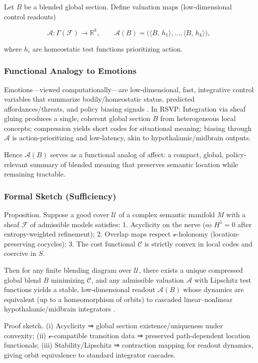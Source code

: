 \documentclass[12pt]{article}
\begin{document}
Let $B$ be a blended global section. Define valuation maps (low-dimensional control readouts)

\[
\mathcal{A}:\Gamma(\mathcal{F}) \to \mathbb{R}^k, \qquad \mathcal{A}(B) = \big( \langle B,\, h_1\rangle,\dots,\langle B,\, h_k\rangle \big),
\]

where $h_i$ are homeostatic test functions prioritizing action.

\subsubsection{Functional Analogy to Emotions}

Emotions—viewed computationally—are low-dimensional, fast, integrative control variables that summarize bodily/homeostatic status, predicted affordances/threats, and policy biasing signals \citep{Pessoa2017}. In RSVP: Integration via sheaf gluing produces a single, coherent global section $B$ from heterogeneous local concepts; compression yields short codes for situational meaning; biasing through $\mathcal{A}$ is action-prioritizing and low-latency, akin to hypothalamic/midbrain outputs.

Hence $\mathcal{A}(B)$ serves as a functional analog of affect: a compact, global, policy-relevant summary of blended meaning that preserves semantic location while remaining tractable.

\subsubsection{Formal Sketch (Sufficiency)}

Proposition. Suppose a good cover $\mathcal{U}$ of a complex semantic manifold $M$ with a sheaf $\mathcal{F}$ of admissible models satisfies: 1. Acyclicity on the nerve (so $H^1=0$ after entropy-weighted refinement); 2. Overlap maps respect $\mathcal{v}$-holonomy (location-preserving cocycles); 3. The cost functional $\mathcal{C}$ is strictly convex in local codes and coercive in $S$.

Then for any finite blending diagram over $\mathcal{U}$, there exists a unique compressed global blend $B$ minimizing $\mathcal{C}$, and any admissible valuation $\mathcal{A}$ with Lipschitz test functions yields a stable, low-dimensional readout $\mathcal{A}(B)$ whose dynamics are equivalent (up to a homeomorphism of orbits) to cascaded linear–nonlinear hypothalamic/midbrain integrators \citep{Pessoa2017}.

Proof sketch. (i) Acyclicity ⇒ global section existence/uniqueness under convexity; (ii) $\mathcal{v}$-compatible transition data ⇒ preserved path-dependent location functionals; (iii) Stability/Lipschitz ⇒ contraction mapping for readout dynamics, giving orbit equivalence to standard integrator cascades.
\end{document}
